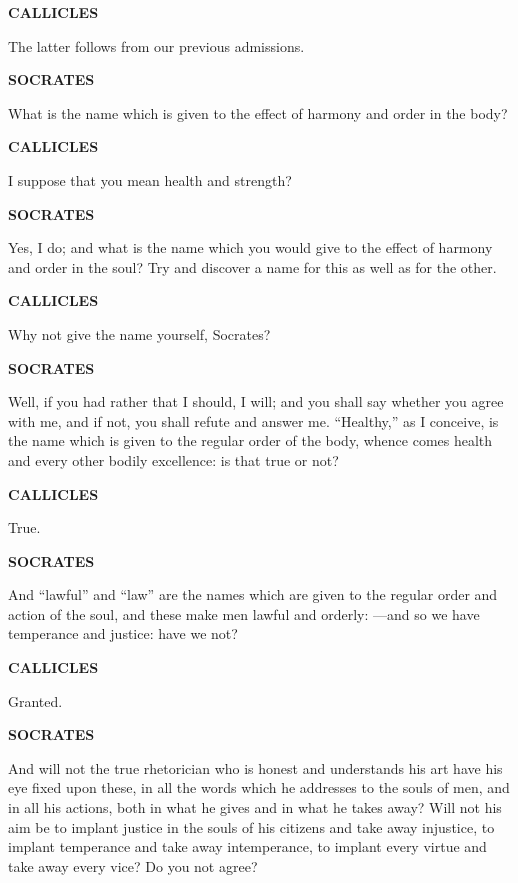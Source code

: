 \documentclass[11pt,letter]{article}
\begin{document}
\par \textbf{CALLICLES}
\par   The latter follows from our previous admissions.

\par \textbf{SOCRATES}
\par   What is the name which is given to the effect of harmony and order in the body?

\par \textbf{CALLICLES}
\par   I suppose that you mean health and strength?

\par \textbf{SOCRATES}
\par   Yes, I do; and what is the name which you would give to the effect of harmony and order in the soul? Try and discover a name for this as well as for the other.

\par \textbf{CALLICLES}
\par   Why not give the name yourself, Socrates?

\par \textbf{SOCRATES}
\par   Well, if you had rather that I should, I will; and you shall say whether you agree with me, and if not, you shall refute and answer me. “Healthy,” as I conceive, is the name which is given to the regular order of the body, whence comes health and every other bodily excellence:  is that true or not?

\par \textbf{CALLICLES}
\par   True.

\par \textbf{SOCRATES}
\par   And “lawful” and “law” are the names which are given to the regular order and action of the soul, and these make men lawful and orderly: —and so we have temperance and justice:  have we not?

\par \textbf{CALLICLES}
\par   Granted.

\par \textbf{SOCRATES}
\par   And will not the true rhetorician who is honest and understands his art have his eye fixed upon these, in all the words which he addresses to the souls of men, and in all his actions, both in what he gives and in what he takes away? Will not his aim be to implant justice in the souls of his citizens and take away injustice, to implant temperance and take away intemperance, to implant every virtue and take away every vice? Do you not agree?
\end{document}
